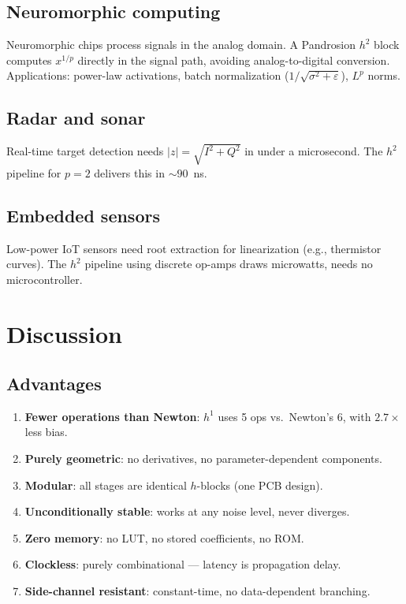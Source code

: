 \documentclass[11pt,a4paper]{article}
\theoremstyle{definition}
\newcommand{\eps}{\varepsilon}
\begin{document}
\subsection{Neuromorphic computing}

Neuromorphic chips process signals in the analog domain.  A Pandrosion $h^2$ block computes $x^{1/p}$ directly in the signal path, avoiding analog-to-digital conversion.  Applications: power-law activations, batch normalization ($1/\sqrt{\sigma^2 + \eps}$), $L^p$ norms.

\subsection{Radar and sonar}

Real-time target detection needs $|z| = \sqrt{I^2 + Q^2}$ in under a microsecond.  The $h^2$ pipeline for $p = 2$ delivers this in $\sim 90$~ns.

\subsection{Embedded sensors}

Low-power IoT sensors need root extraction for linearization (e.g., thermistor curves).  The $h^2$ pipeline using discrete op-amps draws microwatts, needs no microcontroller.

\section{Discussion}
\label{sec:discussion}

\subsection{Advantages}

\begin{enumerate}
  \item \textbf{Fewer operations than Newton}: $h^1$ uses 5 ops vs.\ Newton's 6, with $2.7\times$ less bias.
  \item \textbf{Purely geometric}: no derivatives, no parameter-dependent components.
  \item \textbf{Modular}: all stages are identical $h$-blocks (one PCB design).
  \item \textbf{Unconditionally stable}: works at any noise level, never diverges.
  \item \textbf{Zero memory}: no LUT, no stored coefficients, no ROM.
  \item \textbf{Clockless}: purely combinational --- latency is propagation delay.
  \item \textbf{Side-channel resistant}: constant-time, no data-dependent branching.
\end{enumerate}
\end{document}
